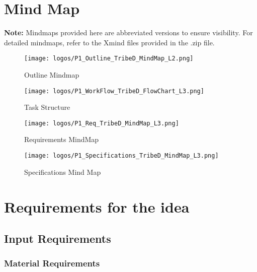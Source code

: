 \documentclass[table,french,english]{rapportCS}
\begin{document}
\section*{Mind Map}\label{sec:mindmap} 
\textbf{Note:} Mindmaps provided here are abbreviated versions to ensure visibility. For detailed mindmaps, refer to the Xmind files provided in the .zip file.
\vspace{2cm}
\begin{figure}[h]
    \centering
    \texttt{[image: logos/P1\_Outline\_TribeD\_MindMap\_L2.png]}
    \caption{Outline Mindmap}
    \label{fig:outlinemindmap}
\end{figure}
\begin{figure}
    \centering
    \texttt{[image: logos/P1\_WorkFlow\_TribeD\_FlowChart\_L3.png]}
    \caption{Task Structure}
    \label{fig:outlinemindmap}
\end{figure}
\begin{figure}[htbp]
  \centering
  \begin{adjustbox}{valign=c}
    \texttt{[image: logos/P1\_Req\_TribeD\_MindMap\_L3.png]} %
  \end{adjustbox}
  \caption{Requirements MindMap}
  \label{fig:reqmindmap}
\end{figure}
\begin{figure}
    \centering
    \texttt{[image: logos/P1\_Specifications\_TribeD\_MindMap\_L3.png]}
    \caption{Specifications Mind Map}
    \label{fig:specsmindmap}
\end{figure}

\newpage



\newpage
{}
\setcounter{page}{1} %
\section{Requirements for the idea}\label{sec:requirements}
    

\subsection{ Input Requirements}\label{sec:inputspec}
\subsubsection{Material Requirements}\label{sec:matspec}
\end{document}

